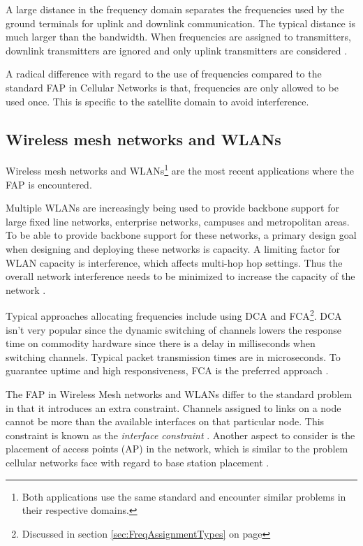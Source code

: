  A large distance in the frequency domain separates the frequencies used by the ground terminals for uplink and downlink communication. The typical distance is much larger than the bandwidth. When frequencies are assigned to transmitters, downlink transmitters are ignored and only uplink transmitters are considered \cite{Karen2004}. 

A radical difference with regard to the use of frequencies compared to the standard FAP in Cellular Networks is that, frequencies are only allowed to be used once. This is specific to the satellite domain to avoid interference\cite{Karen2004}.

\subsection{Wireless mesh networks and WLANs}
Wireless mesh networks and WLANs\footnote{Both applications use the same standard and encounter similar problems in their respective domains.} are the most recent applications where the FAP is encountered. 

Multiple WLANs are increasingly being used to provide backbone support for large fixed line networks, enterprise networks, campuses and metropolitan areas. To be able to provide backbone support for these networks, a primary design goal when designing and deploying these networks is capacity. A limiting factor for WLAN capacity is interference, which affects multi-hop hop settings. Thus the overall network interference needs to be minimized to increase the capacity of the network \cite{MultiradioMeshNetworks}. 

Typical approaches allocating frequencies include using DCA and FCA\footnote{Discussed in section \ref{sec:FreqAssignmentTypes} on page \pageref{sec:FreqAssignmentTypes}}. DCA isn't very popular since the dynamic switching of channels lowers the response time on commodity hardware since there is a delay in milliseconds when switching channels. Typical packet transmission times are in microseconds. To guarantee uptime and high responsiveness, FCA is the preferred approach \cite{MultiradioMeshNetworks}.

The FAP in Wireless Mesh networks and WLANs differ to the standard problem in that it introduces an extra constraint. Channels assigned to links on a node cannot be more than the available interfaces on that particular node. This constraint is known as the \emph{interface constraint} \cite{MultiradioMeshNetworks}. Another aspect to consider is the placement of access points (AP) in the network, which is similar to the problem cellular networks face with regard to base station placement \cite{Karen2004}.

